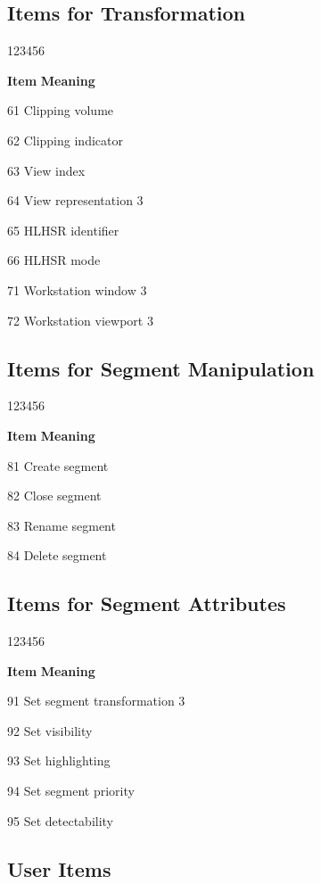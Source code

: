 \subsection*{Items for Transformation}

\begin{DLtt}{123456}
\item[{\rm\bf Item}] {\bf Meaning}
\item[61]Clipping volume
\item[62]Clipping indicator
\item[63]View index
\item[64]View representation 3
\item[65]HLHSR identifier
\item[66]HLHSR mode
\item[71]Workstation window 3
\item[72]Workstation viewport 3
\end{DLtt}

\subsection*{Items for Segment Manipulation}

\begin{DLtt}{123456}
\item[{\rm\bf Item}] {\bf Meaning}
\item[81]Create segment
\item[82]Close segment
\item[83]Rename segment
\item[84]Delete segment
\end{DLtt}

\subsection*{Items for Segment Attributes}

\begin{DLtt}{123456}
\item[{\rm\bf Item}] {\bf Meaning}
\item[91]Set segment transformation 3
\item[92]Set visibility
\item[93]Set highlighting
\item[94]Set segment priority
\item[95]Set detectability
\end{DLtt}

\subsection*{User Items}

